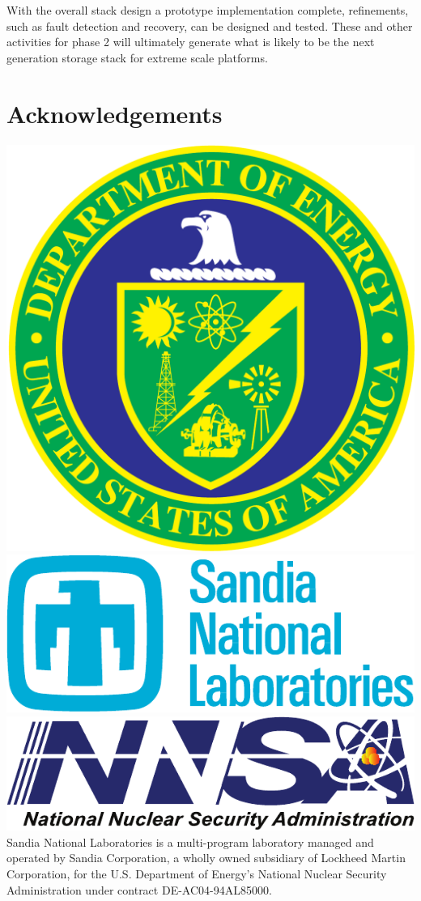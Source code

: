 \documentclass[conference]{IEEEtran}
\begin{document}
With the overall stack design a prototype implementation complete, refinements,
such as fault detection and recovery, can be designed and tested.  These and
other activities for phase 2 will ultimately generate what is likely to be the
next generation storage stack for extreme scale platforms.

\section{Acknowledgements}

\includegraphics[scale=0.07]{logos/doe_logo}
\includegraphics[scale=0.30]{logos/snl_logo}
\includegraphics[scale=0.35]{logos/nnsa_logo}
Sandia National Laboratories is a multi-program laboratory managed and operated
by Sandia Corporation, a wholly owned subsidiary of Lockheed Martin
Corporation, for the U.S. Department of Energy's National Nuclear Security
Administration under contract DE-AC04-94AL85000.




\vfill\eject
\end{document}
